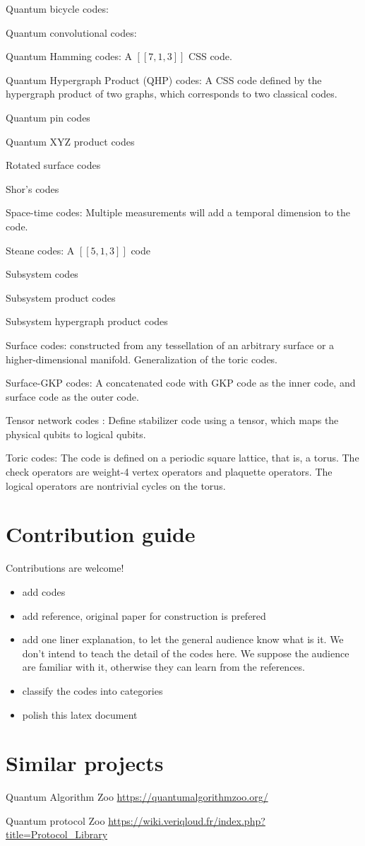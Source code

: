 \documentclass[aps,%
pra, twocolumn,%
notitlepage,longbibliography]{revtex4-2}
\begin{document}
Quantum bicycle codes:

Quantum convolutional codes:

Quantum Hamming codes:
A $[[7,1,3]]$ CSS code.


Quantum Hypergraph Product (QHP) codes:
A CSS code defined by the hypergraph product of two graphs, which
corresponds to two classical codes.

Quantum pin codes

Quantum XYZ product codes

Rotated surface codes

Shor's codes

Space-time codes: Multiple measurements will add a temporal dimension
to the code.

Steane codes: A $[[5,1,3]]$ code

Subsystem codes

Subsystem product codes

Subsystem hypergraph product codes

Surface codes: constructed from any tessellation of an arbitrary
surface or a higher-dimensional manifold. Generalization of the toric codes.

Surface-GKP codes: A concatenated code with GKP code as the inner
code, and surface code as the outer code.

Tensor network codes \cite{farrelly2020tensor}: Define stabilizer code
using a tensor, which maps the physical qubits to logical qubits.



Toric codes: The code is defined on a periodic square lattice, that
is, a torus. The check operators are weight-4 vertex operators and
plaquette operators. The logical operators are nontrivial cycles on
the torus.





\section{Contribution guide}
Contributions are welcome!
\begin{itemize}
\item add codes
\item add reference, original paper for construction is prefered
\item add one liner explanation, to let the general audience know what
  is it. We don't intend to teach the detail of the codes here. We
  suppose the audience are familiar with it, otherwise they can learn
  from the references.
\item classify the codes into categories
\item polish this latex document
\end{itemize}

\section{Similar projects}
Quantum Algorithm Zoo 
\url{https://quantumalgorithmzoo.org/}

Quantum protocol Zoo
\url{https://wiki.veriqloud.fr/index.php?title=Protocol_Library}

%

\end{document}
